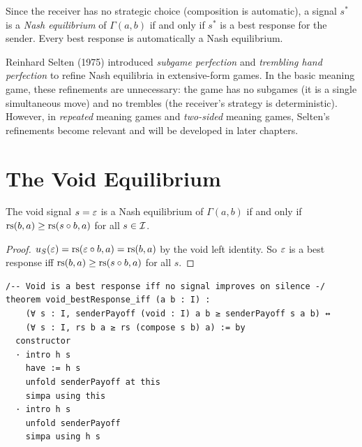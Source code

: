 \begin{definition}
\label{def:nash-mg}
Since the receiver has no strategic choice (composition is automatic), a
signal $s^*$ is a \emph{Nash equilibrium} of $\Gamma(a, b)$ if and only if
$s^*$ is a best response for the sender. Every best response is automatically
a Nash equilibrium.
\end{definition}

\begin{remark}
Reinhard Selten (1975) introduced \emph{subgame perfection} and
\emph{trembling hand perfection} to refine Nash equilibria in extensive-form
games. In the basic meaning game, these refinements are unnecessary: the game
has no subgames (it is a single simultaneous move) and no trembles (the
receiver's strategy is deterministic). However, in \emph{repeated} meaning
games and \emph{two-sided} meaning games, Selten's refinements become
relevant and will be developed in later chapters.
\end{remark}


\section{The Void Equilibrium}

\begin{theorem}
\label{thm:void-equilibrium}
The void signal $s = \varepsilon$ is a Nash equilibrium of $\Gamma(a, b)$ if and
only if $\mathrm{rs}(b, a) \geq \mathrm{rs}(s \circ b, a)$ for all $s \in \mathcal{I}$.
\end{theorem}

\begin{proof}
$u_S(\varepsilon) = \mathrm{rs}(\varepsilon \circ b, a) = \mathrm{rs}(b, a)$ by the void left
identity. So $\varepsilon$ is a best response iff $\mathrm{rs}(b, a) \geq \mathrm{rs}(s \circ b, a)$
for all $s$.
\end{proof}

\begin{lstlisting}[caption={Lean 4: Void equilibrium characterization}]
/-- Void is a best response iff no signal improves on silence -/
theorem void_bestResponse_iff (a b : I) :
    (∀ s : I, senderPayoff (void : I) a b ≥ senderPayoff s a b) ↔
    (∀ s : I, rs b a ≥ rs (compose s b) a) := by
  constructor
  · intro h s
    have := h s
    unfold senderPayoff at this
    simpa using this
  · intro h s
    unfold senderPayoff
    simpa using h s
\end{lstlisting}

